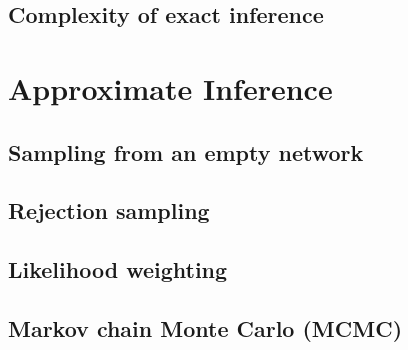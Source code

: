 \documentclass[12pt,a4paper,twoside]{book}
\begin{document}
\section{Complexity of exact inference}

\label{s_4_3}

\chapter{Approximate Inference}

\label{c_5}

\section{Sampling from an empty network}

\label{s_5_1}

\section{Rejection sampling}

\label{s_5_2}

\section{Likelihood weighting}

\label{s_5_3}

\section{Markov chain Monte Carlo (MCMC)}

\label{s_5_4}
\end{document}
